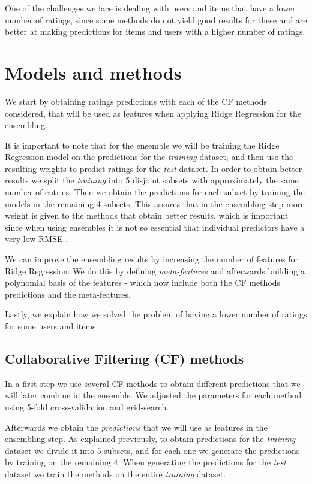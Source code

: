 \documentclass[10pt,conference,compsocconf]{IEEEtran}
\begin{document}
  One of the challenges we face is dealing with users and items that have a lower number of ratings, since some methods do not yield good results for these and are better at making predictions for items and users with a higher number of ratings.

\section{Models and methods}
	\label{sec:models-methods}
  We start by obtaining ratings predictions with each of the CF methods considered, that will be used as features when applying Ridge Regression for the ensembling.

  It is important to note that for the ensemble we will be training the Ridge Regression model on the predictions for the \emph{training} dataset, and then use the resulting weights to predict ratings for the \emph{test} dataset. In order to obtain better results we split the \emph{training} into 5 disjoint subsets with approximately the same number of entries. Then we obtain the predictions for each subset by training the models in the remaining 4 subsets. This assures that in the ensembling step more weight is given to the methods that obtain better results, which is important since when using ensembles it is not so essential that individual predictors have a very low RMSE \cite{toscher2009bigchaos}.

  We can improve the ensembling results by increasing the number of features for Ridge Regression. We do this by defining \emph{meta-features} and afterwards building a polynomial basis of the features - which now include both the CF methods predictions and the meta-features.

  Lastly, we explain how we solved the problem of having a lower number of ratings for some users and items.

  \subsection{Collaborative Filtering (CF) methods} %
  \label{sub:collaborative_filtering_methods}
    In a first step we use several CF methods to obtain different predictions that we will later combine in the ensemble. We adjusted the parameters for each method using 5-fold cross-validation and grid-search.

    Afterwards we obtain the \emph{predictions} that we will use as features in the ensembling step. As explained previously, to obtain predictions for the \emph{training} dataset we divide it into 5 subsets, and for each one we generate the predictions by training on the remaining 4. When generating the predictions for the \emph{test} dataset we train the methods on the entire \emph{training} dataset.
\end{document}
